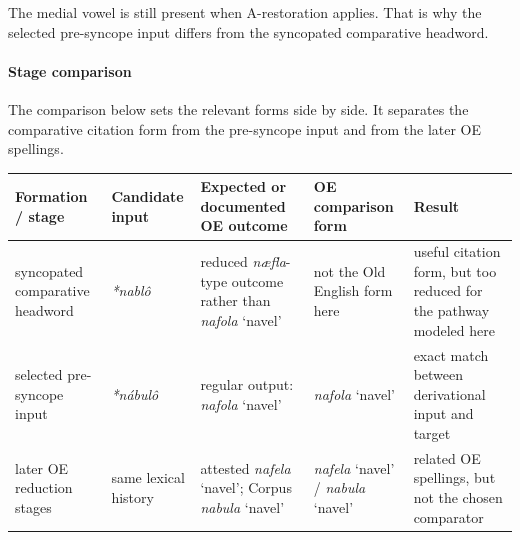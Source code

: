 \documentclass[
  british,
  a4paper,
]{article}
\newcounter{none} %
\begin{document}
The medial vowel is still present when A-restoration applies. That is
why the selected pre-syncope input differs from the syncopated
comparative headword.

\paragraph{Stage comparison}\label{stage-comparison-1}

The comparison below sets the relevant forms side by side. It separates
the comparative citation form from the pre-syncope input and from the
later OE spellings.

{\def\LTcaptype{none} %
\begin{longtable}[]{@{}
  >{\raggedright\arraybackslash}p{}
  >{\raggedright\arraybackslash}p{}
  >{\raggedright\arraybackslash}p{}
  >{\raggedright\arraybackslash}p{}
  >{\raggedright\arraybackslash}p{}@{}}
\toprule\noalign{}
\begin{minipage}[b]{\linewidth}\raggedright
Formation / stage
\end{minipage} & \begin{minipage}[b]{\linewidth}\raggedright
Candidate input
\end{minipage} & \begin{minipage}[b]{\linewidth}\raggedright
Expected or documented OE outcome
\end{minipage} & \begin{minipage}[b]{\linewidth}\raggedright
OE comparison form
\end{minipage} & \begin{minipage}[b]{\linewidth}\raggedright
Result
\end{minipage} \\
\midrule\noalign{}
\endhead
\bottomrule\noalign{}
\endlastfoot
syncopated comparative headword & {\emph{*nablô}} & reduced
\emph{næfla}-type outcome rather than {\emph{nafola}} `navel' & not the
Old English form here & useful citation form, but too reduced for the
pathway modeled here \\
selected pre-syncope input & {\emph{*nábulô}} & regular output:
{\emph{nafola}} `navel' & {\emph{nafola}} `navel' & exact match between
derivational input and target \\
later OE reduction stages & same lexical history & attested
{\emph{nafela}} `navel'; Corpus {\emph{nabula}} `navel' &
{\emph{nafela}} `navel' / {\emph{nabula}} `navel' & related OE
spellings, but not the chosen comparator \\
\end{longtable}
}
\end{document}
